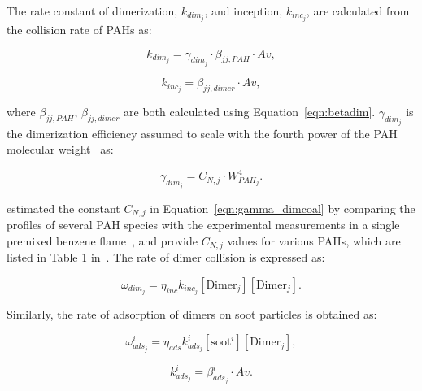 The rate constant of dimerization, ${k_{dim_{j}}}$, and inception, ${k_{inc_{j}}}$, are calculated from the collision rate of PAHs as:

\begin{equation}
	k_{dim_{j}}=
	\gamma_{dim_j}\cdot\beta_{jj,PAH}\cdot Av
	\label{eqn:kdim_dimcoal},
\end{equation}

\begin{equation}
	k_{inc_{j}}=
	\beta_{jj,dimer}\cdot Av
	\label{eqn:kinc_dimcoal},
\end{equation}

\noindent where $\beta_{jj,PAH}$, $\beta_{jj,dimer}$ are both calculated using Equation~\eqref{eqn:betadim}. $\gamma_{dim_j}$ is the dimerization efficiency assumed to scale with the fourth power of the PAH molecular weight~\cite{blanquart2009analyzing} as:

\begin{equation}
	\gamma_{dim_j}=
	C_{N,j}\cdot W_{PAH_j}^4.
	\label{eqn:gamma_dimcoal}
\end{equation} 

\citet{blanquart2009joint} estimated the constant ${C_{N,j}}$ in Equation~\eqref{eqn:gamma_dimcoal} by comparing the profiles of several PAH species with the experimental measurements in a single premixed benzene flame~\citep{tregrossi1999combustion}, and provide ${C_{N,j}}$ values for various PAHs, which are listed in Table 1 in~\citep{blanquart2009analyzing}. The rate of dimer collision is expressed as:

\begin{equation}
	\omega_{dim_j} = \eta_{inc} k_{inc_{j}} [\mathrm{Dimer}_j] [\mathrm{Dimer}_j].
	\label{eqn:wdim_dimcoal}
\end{equation}


Similarly, the rate of adsorption of dimers on soot particles is obtained as:

\begin{equation}
	\omega^i_{ads_j} = \eta_{ads} k^i_{ads_{j}} [\mathrm{soot}^i] [\mathrm{Dimer}_j],
\end{equation}

\begin{equation}
	k^i_{ads_{j}}=
	\beta^i_{ads_j}\cdot Av.
	\label{eqn:kads_dimcoal}
\end{equation}

